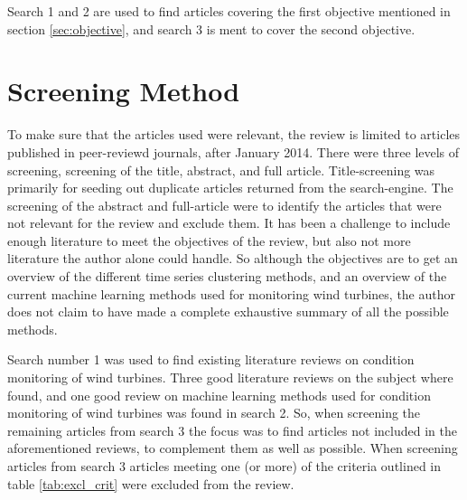 Search 1 and 2 are used to find articles covering the first objective mentioned in section \ref{sec:objective}, and search 3 is ment to cover the second objective.
\newpage
\section{Screening Method} \label{sec:screening}
To make sure that the articles used were relevant, the review is limited to articles published in peer-reviewd journals, after January 2014. 
There were three levels of screening, screening of the title, abstract, and full article. 
Title-screening was primarily for seeding out duplicate articles returned from the search-engine. 
The screening of the abstract and full-article were to identify the articles that were not relevant for the review and exclude them. 
It has been a challenge to include enough literature to meet the objectives of the review, but also not more literature the author alone could handle. 
So although the objectives are to get an overview of the different time series clustering methods, 
and an overview of the current machine learning methods used for monitoring wind turbines, 
the author does not claim to have made a complete exhaustive summary of all the possible methods. \bigskip

Search number 1 was used to find existing literature reviews on condition monitoring of wind turbines. 
Three good literature reviews on the subject where found, and one good review on machine learning methods used for condition monitoring of wind turbines was found in search 2. 
So, when screening the remaining articles from search 3 the focus was to find articles not included in the aforementioned reviews, to complement them as well as possible.
When screening articles from search 3 articles meeting one (or more) of the criteria outlined in table \ref{tab:excl_crit} were excluded from the review.

